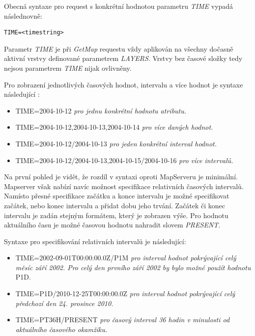 Obecná syntaxe pro request s konkrétní hodnotou parametru \textit{TIME} vypadá následnovně: 

\begin{verbatim}
TIME=<timestring>
\end{verbatim}

Parametr \textit{TIME} je při \textit{GetMap} requestu vždy aplikován na všechny dočasně aktivní vrstvy definované parametrem \textit{LAYERS}. Vrstvy bez časové složky tedy nejsou parametrem \textit{TIME} nijak ovlivněny.

Pro zobrazení jednotlivých časových hodnot, intervalu a více hodnot je syntaxe následující \cite{geoserver-time}: 

\begin{itemize}
	\item TIME=2004-10-12 \textit{pro jednu konkrétní hodnotu atributu.}
	\item TIME=2004-10-12,2004-10-13,2004-10-14 \textit{pro více daných hodnot.}
	\item TIME=2004-10-12/2004-10-13 \textit{pro jeden konkrétní interval hodnot.}
	\item TIME=2004-10-12/2004-10-13,2004-10-15/2004-10-16 \textit{pro více intervalů.}
\end{itemize}

Na první pohled je vidět, že rozdíl v syntaxi oproti MapServeru je minimální. Mapserver však nabízí navíc možnost specifikace relativních časových intervalů. Namísto přesné specifikace začátku a konce intervalu je možné specifikovat začátek, nebo konec intervalu a přidat dobu jeho trvání. Začátek či konec intervalu je zadán stejným formátem, který je zobrazen výše. Pro hodnotu aktuálního času je možné časovou hodnotu nahradit slovem \textit{PRESENT}.

Syntaxe pro specifikování relativních intervalů je následující\cite{geoserver-time}:

\begin{itemize}
	\item TIME=2002-09-01T00:00:00.0Z/P1M \textit{pro interval hodnot pokrývající celý měsíc září 2002. Pro celý den prvního září 2002 by bylo možné použít hodnotu} P1D.
	\item TIME=P1D/2010-12-25T00:00:00.0Z \textit{pro interval hodnot pokrývající celý předchozí den 24. prosince 2010.}
	\item TIME=PT36H/PRESENT \textit{pro časový interval 36 hodin v minulosti od aktuálního časového okamžiku.}
\end{itemize}

